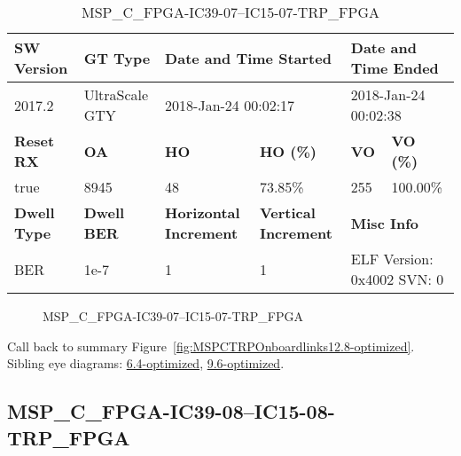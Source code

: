 \begin{table}[h]
\centering
\caption{MSP\_C\_FPGA-IC39-07--IC15-07-TRP\_FPGA}
\label{tab:MSPCFPGAIC3907IC1507TRPFPGA12.8-optimized}
\begin{tabular}{@{}|l|l|l|l|l|l|@{}}
\toprule
\textbf{SW Version}                & \textbf{GT Type}   & \multicolumn{2}{l|}{\textbf{Date and Time Started}}            & \multicolumn{2}{l|}{\textbf{Date and Time Ended}}        \\ \midrule
2017.2                       & UltraScale GTY          & \multicolumn{2}{l|}{2018-Jan-24 00:02:17}                   & \multicolumn{2}{l|}{2018-Jan-24 00:02:38}               \\ \midrule
\textbf{Reset RX}                  & \textbf{OA} & \textbf{HO}   & \textbf{HO (\%)} & \textbf{VO} & \textbf{VO (\%)} \\ \midrule
true & 8945        & 48          & 73.85\%        & 255        & 100.00\%       \\ \midrule
\textbf{Dwell Type}                & \textbf{Dwell BER} & \textbf{Horizontal Increment} & \textbf{Vertical Increment}    & \multicolumn{2}{l|}{\textbf{Misc Info}}                  \\ \midrule
BER                            & 1e-7        & 1        & 1           & \multicolumn{2}{l|}{ELF Version: 0x4002 SVN: 0}                         \\ \bottomrule
\end{tabular}
\end{table}

\begin{figure}[h]
\caption{MSP\_C\_FPGA-IC39-07--IC15-07-TRP\_FPGA} \label{fig:MSPCFPGAIC3907IC1507TRPFPGA12.8-optimized}
\end{figure}

Call back to summary Figure~\ref{fig:MSPCTRPOnboardlinks12.8-optimized}.
Sibling eye diagrams: \hyperref[sec:MSPCFPGAIC3907IC1507TRPFPGA6.4-optimized]{6.4-optimized}, \hyperref[sec:MSPCFPGAIC3907IC1507TRPFPGA9.6-optimized]{9.6-optimized}.

\clearpage
\newpage


\subsection{MSP\_C\_FPGA-IC39-08--IC15-08-TRP\_FPGA}\label{sec:MSPCFPGAIC3908IC1508TRPFPGA12.8-optimized}

